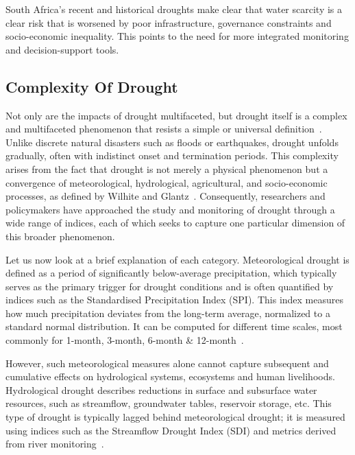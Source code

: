 South Africa’s recent and historical droughts make clear that water scarcity is a clear risk that is worsened by poor infrastructure, governance constraints and socio-economic inequality. This points to the need for more integrated monitoring and decision-support tools.

\subsection{Complexity Of Drought}
Not only are the impacts of drought multifaceted, but drought itself is a complex and multifaceted phenomenon that resists a simple or universal definition~\cite{Llyod+Benjamin}. Unlike discrete natural disasters such as floods or earthquakes, drought unfolds gradually, often with indistinct onset and termination periods. This complexity arises from the fact that drought is not merely a physical phenomenon but a convergence of meteorological, hydrological, agricultural, and socio-economic processes, as defined by Wilhite and Glantz~\cite{Wilhite+Glantz}. Consequently, researchers and policymakers have approached the study and monitoring of drought through a wide range of indices, each of which seeks to capture one particular dimension of this broader phenomenon.

Let us now look at a brief explanation of each category. Meteorological drought is defined as a period of significantly below-average precipitation, which typically serves as the primary trigger for drought conditions and is often quantified by indices such as the Standardised Precipitation Index (SPI). This index measures how much precipitation deviates from the long-term average, normalized to a standard normal distribution. It can be computed for different time scales, most commonly for  1-month, 3-month, 6-month \& 12-month~\cite{mckee1993relationship, douville2021water}. 

However, such meteorological measures alone cannot capture subsequent and cumulative effects on hydrological systems, ecosystems and human livelihoods. Hydrological drought describes reductions in surface and subsurface water resources, such as streamflow, groundwater tables, reservoir storage, etc. This type of drought is typically lagged behind meteorological drought; it is measured using indices such as the Streamflow Drought Index (SDI) and metrics derived from river monitoring~\cite{nalbantis2009assessment, Loon+Anne}. 

